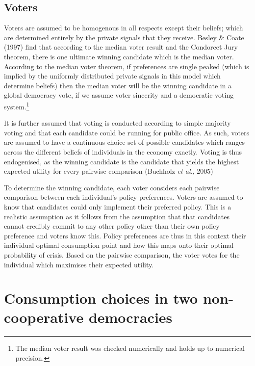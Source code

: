 \documentclass[11pt,preprint, authoryear]{elsarticle}
\numberwithin{equation}{section}
\numberwithin{figure}{section}
\numberwithin{table}{section}
\let\rmarkdownfootnote\footnote%
\def\footnote{\protect\rmarkdownfootnote}
\begin{document}
\hypertarget{voters}{%
\subsection*{Voters}\label{voters}}

Voters are assumed to be homogenous in all respects except their
beliefs; which are determined entirely by the private signals that they
receive. Besley \& Coate (1997) find that according to the median voter
result and the Condorcet Jury theorem, there is one ultimate winning
candidate which is the median voter. According to the median voter
theorem, if preferences are single peaked (which is implied by the
uniformly distributed private signals in this model which determine
beliefs) then the median voter will be the winning candidate in a global
democracy vote, if we assume voter sincerity and a democratic voting
system.\footnote{The median voter result was checked numerically and
  holds up to numerical precision.}

It is further assumed that voting is conducted according to simple
majority voting and that each candidate could be running for public
office. As such, voters are assumed to have a continuous choice set of
possible candidates which ranges across the different beliefs of
individuals in the economy exactly. Voting is thus endogenised, as the
winning candidate is the candidate that yields the highest expected
utility for every pairwise comparison (Buchholz \emph{et al.}, 2005)

To determine the winning candidate, each voter considers each pairwise
comparison between each individual's policy preferences. Voters are
assumed to know that candidates could only implement their preferred
policy. This is a realistic assumption as it follows from the assumption
that that candidates cannot credibly commit to any other policy other
than their own policy preference and voters know this. Policy
preferences are thus in this context their individual optimal
consumption point and how this maps onto their optimal probability of
crisis. Based on the pairwise comparison, the voter votes for the
individual which maximises their expected utility.

\hypertarget{consumption-choices-in-two-non-cooperative-democracies}{%
\section{Consumption choices in two non-cooperative
democracies}\label{consumption-choices-in-two-non-cooperative-democracies}}
\end{document}
